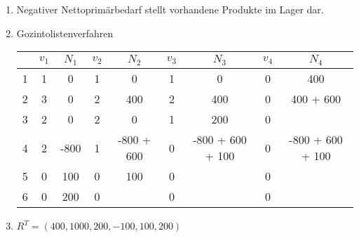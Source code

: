 \documentclass{article}
\begin{document}
\begin{enumerate}[label=(\alph*)]
\begin{center}
		\end{center}
		\item Negativer Nettoprimärbedarf stellt vorhandene Produkte im Lager dar.
		\item Gozintolistenverfahren
		\begin{center}
			\begin{tabular}{c|cc|cc|cc|cc}
				& $v_1$ & $N_1$ & $v_2$ & $N_2$ & $v_3$ & $N_3$ & $v_4$ & $N_4$ \\
				\hline
				1 & 1 & 0 & 1 & 0 & 1 & 0 & 0 & 400 \\
				2 & 3 & 0 & 2 & 400 & 2 & 400 & 0 & 400 + 600 \\
				3 & 2 & 0 & 2 & 0 & 1 & 200 & 0 & \\
				4 & 2 & -800 & 1 & -800 + 600 & 0 & -800 + 600 + 100 & 0 & -800 + 600 + 100 \\
				5 & 0 & 100 & 0 & 100 & 0 & & 0 & \\
				6 & 0 & 200 & 0 & & 0 & & 0 &
			\end{tabular}
		\end{center}
		\item $R^T=(400,1000,200,-100,100,200)$
	\end{enumerate}
\end{document}
